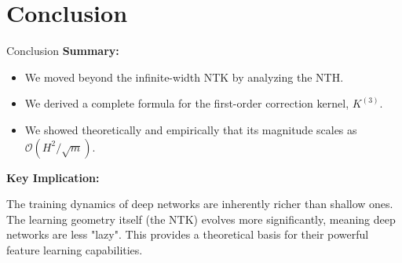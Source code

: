 \documentclass{beamer}
\newcommand{\Order}{\mathcal{O}}
\begin{document}
\section{Conclusion}

\begin{frame}{Conclusion}
\textbf{Summary:}
\begin{itemize}
    \item We moved beyond the infinite-width NTK by analyzing the NTH.
    \item We derived a complete formula for the first-order correction kernel, $K^{(3)}$.
    \item We showed theoretically and empirically that its magnitude scales as $\Order(H^2/\sqrt{m})$.
\end{itemize}
\vspace{1cm}
\textbf{Key Implication:}
\begin{alertblock}
The training dynamics of deep networks are inherently richer than shallow ones. The learning geometry itself (the NTK) evolves more significantly, meaning deep networks are less "lazy". This provides a theoretical basis for their powerful feature learning capabilities.
\end{alertblock}
\end{frame}
\end{document}
